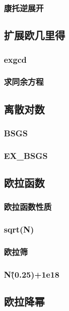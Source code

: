 \documentclass[10pt,a4paper]{article}
\begin{document}
	\subsubsection{康托逆展开}
	
	\subsection{扩展欧几里得}
	\subsubsection{exgcd}
	
	\subsubsection{求同余方程}
	
	\subsection{离散对数}
	\subsubsection{BSGS}
	
	\subsubsection{EX\_BSGS}
	
	\subsection{欧拉函数}
	\subsubsection{欧拉函数性质}
	
	\subsubsection{sqrt(N)}
	
	\subsubsection{欧拉筛}
	
	\subsubsection{N\^(0.25)+1e18}
	
	\subsection{欧拉降幂}
\end{document}
